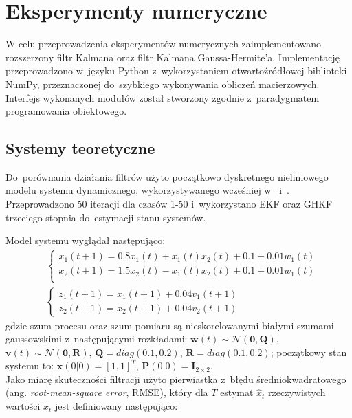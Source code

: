 \chapter{Eksperymenty numeryczne}
\label{cha:numerical_experiments}
W celu przeprowadzenia eksperymentów numerycznych zaimplementowano rozszerzony filtr Kalmana oraz filtr Kalmana Gaussa-Hermite'a. Implementację przeprowadzono w~języku Python z~wykorzystaniem otwartoźródłowej biblioteki NumPy, przeznaczonej do~szybkiego wykonywania obliczeń macierzowych. Interfejs wykonanych modułów został stworzony zgodnie z~paradygmatem programowania obiektowego. \par
\section{Systemy teoretyczne}
\label{sec:theoretical_systems}
Do~porównania działania filtrów użyto początkowo dyskretnego nieliniowego modelu systemu dynamicznego, wykorzystywanego wcześniej w~\cite{Liu} i~\cite{Germani}. Przeprowadzono 50 iteracji dla czasów 1-50 i~wykorzystano EKF oraz GHKF trzeciego stopnia do~estymacji stanu systemów.\par
Model systemu wyglądał następująco:
\begin{align}\label{eq:LiuModel1}
	&\left\{ 
	\begin{array}{l}
	x_1(t+1) = 0.8x_1(t) + x_1(t)x_2(t) + 0.1 + 0.01w_1(t) \\
	x_2(t+1) = 1.5x_2(t) - x_1(t)x_2(t) + 0.1 + 0.01w_1(t) \\
	\end{array}
	\right.\nonumber \\
	&\left\{ 
	\begin{array}{l}
	z_1(t+1) = x_1(t+1) + 0.04v_1(t+1) \\
	z_2(t+1) = x_2(t+1) + 0.04v_2(t+1)
	\end{array}
	\right.
\end{align}
gdzie szum procesu oraz szum pomiaru są nieskorelowanymi białymi szumami gaussowskimi z~następującymi rozkładami: $\boldsymbol{w}(t) \sim \mathcal{N}(\boldsymbol{0}, \boldsymbol{Q})$, $\boldsymbol{v}(t) \sim \mathcal{N}(\boldsymbol{0}, \boldsymbol{R})$, $\boldsymbol{Q}=diag(0.1, 0.2)$, $\boldsymbol{R}=diag(0.1, 0.2)$; początkowy stan systemu to: $\boldsymbol{x}(0|0) = [1,1]^T$, $\boldsymbol{P}(0|0) = \boldsymbol{I}_{2 \times 2}$.\\ 
Jako miarę skuteczności filtracji użyto pierwiastka z~błędu średniokwadratowego (ang. \textit{root-mean-square error}, RMSE), który dla $T$ estymat $\hat{x}_t$ rzeczywistych wartości $x_t$ jest definiowany następująco:
